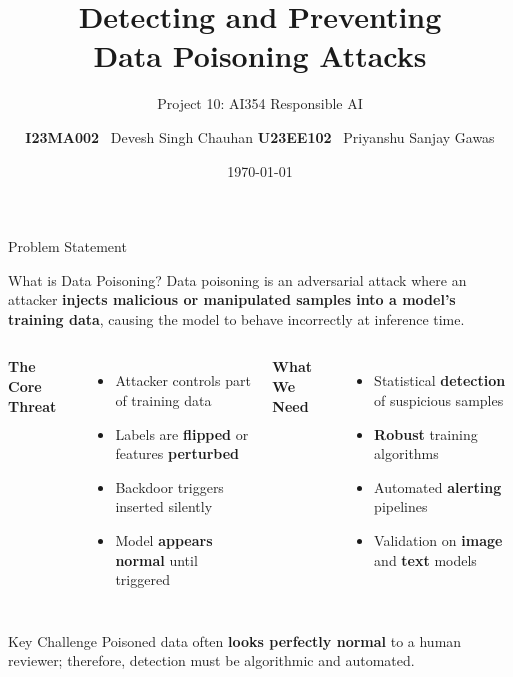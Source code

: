 \documentclass[aspectratio=169]{beamer}
\title[Data Poisoning Attacks]{\textbf{Detecting and Preventing\\Data Poisoning Attacks}}
\subtitle{Project 10: AI354 Responsible AI}
\author[Chauhan \& Gawas]{
	\textbf{I23MA002} \ Devesh Singh Chauhan \quad
	\textbf{U23EE102} \ Priyanshu Sanjay Gawas
}
\institute[]{Department of AI, SVNIT}
\date{\today}
\newcommand{\highlight}[1]{\textcolor{accentblue}{\textbf{#1}}}
\newcommand{\bad}[1]{\textcolor{alertred}{\textbf{#1}}}
\begin{document}
	
	\begin{frame}
		\titlepage

	\end{frame}
	
	\begin{frame}{Problem Statement}
		\begin{block}{What is Data Poisoning?}
			Data poisoning is an adversarial attack where an attacker \highlight{injects malicious
				or manipulated samples into a model's training data}, causing the model to behave
			incorrectly at inference time.
		\end{block}
		
		\vspace{0.4em}
		\begin{columns}[T]
			\column{0.48\textwidth}
			\textbf{The Core Threat}
			\begin{itemize}\setlength{\itemsep}{0pt}
				\item Attacker controls part of training data
				\item Labels are \bad{flipped} or features \bad{perturbed}
				\item Backdoor triggers inserted silently
				\item Model \bad{appears normal} until triggered
			\end{itemize}
			
			\column{0.48\textwidth}
			\textbf{What We Need}
			\begin{itemize}\setlength{\itemsep}{0pt}
				\item Statistical \highlight{detection} of suspicious samples
				\item \highlight{Robust} training algorithms
				\item Automated \highlight{alerting} pipelines
				\item Validation on \highlight{image} and \highlight{text} models
			\end{itemize}
		\end{columns}
		
		\vspace{0.6em}
		\begin{alertblock}{Key Challenge}
			Poisoned data often \textbf{looks perfectly normal} to a human reviewer; therefore,
			detection must be algorithmic and automated.
		\end{alertblock}
	\end{frame}
	
\end{document}
